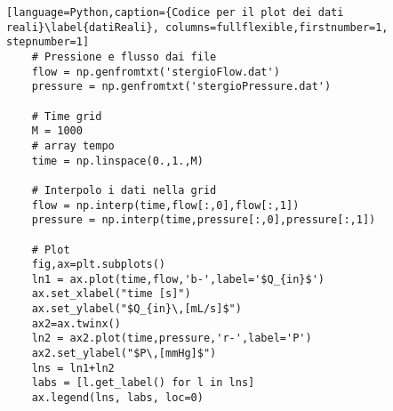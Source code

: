 \begin{lstlisting}[language=Python,caption={Codice per il plot dei dati reali}\label{datiReali}, columns=fullflexible,firstnumber=1, stepnumber=1]
    # Pressione e flusso dai file
    flow = np.genfromtxt('stergioFlow.dat')
    pressure = np.genfromtxt('stergioPressure.dat')

    # Time grid
    M = 1000
    # array tempo
    time = np.linspace(0.,1.,M)

    # Interpolo i dati nella grid
    flow = np.interp(time,flow[:,0],flow[:,1])
    pressure = np.interp(time,pressure[:,0],pressure[:,1])

    # Plot
    fig,ax=plt.subplots()
    ln1 = ax.plot(time,flow,'b-',label='$Q_{in}$')
    ax.set_xlabel("time [s]")
    ax.set_ylabel("$Q_{in}\,[mL/s]$")
    ax2=ax.twinx()
    ln2 = ax2.plot(time,pressure,'r-',label='P')
    ax2.set_ylabel("$P\,[mmHg]$")
    lns = ln1+ln2
    labs = [l.get_label() for l in lns]
    ax.legend(lns, labs, loc=0)
\end{lstlisting}